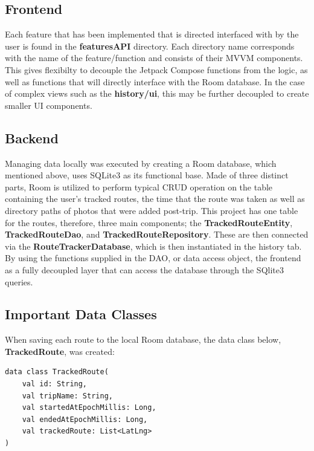 \documentclass{article}
\begin{document}
        \subsection{Frontend}

        Each feature that has been implemented that is directed interfaced with by the user
        is found in the \textbf{featuresAPI} directory. Each directory name corresponds with
        the name of the feature/function and consists of their MVVM components. This gives 
        flexibilty to decouple the Jetpack Compose functions from the logic, as well as 
        functions that will directly interface with the Room database. In the case of complex
        views such as the \textbf{history/ui}, this may be further decoupled to create
        smaller UI components.

        \subsection{Backend}

        Managing data locally was executed by creating a Room database, which mentioned above,
        uses SQLite3 as its functional base. Made of three distinct parts, Room is utilized to
        perform typical CRUD operation on the table containing the user's tracked routes,
        the time that the route was taken as well as directory paths of photos that were added
        post-trip. This project has one table for the routes, therefore, three main components;
        the \textbf{TrackedRouteEntity}, \textbf{TrackedRouteDao}, and \textbf{TrackedRouteRepository}. 
        These are then connected via the \textbf{RouteTrackerDatabase}, which is then instantiated 
        in the history tab. By using the functions supplied in the DAO, or data access object, the 
        frontend as a fully decoupled layer that can access the database through the SQlite3 queries.

    \newpage

            \subsection*{\hfil Important Data Classes \hfil}

            When saving each route to the local Room database,
            the data class below, \textbf{TrackedRoute}, was created:

            \begin{center}
                \begin{verbatim}
data class TrackedRoute(
    val id: String,
    val tripName: String,
    val startedAtEpochMillis: Long,
    val endedAtEpochMillis: Long,
    val trackedRoute: List<LatLng>
)
                \end{verbatim}
            \end{center}
\end{document}
